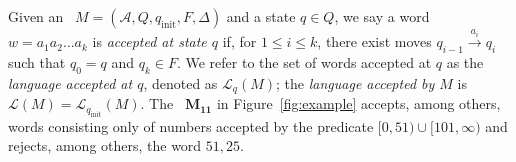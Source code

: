 Given an \SFA\ $M = (\mathcal{A}, Q, q_\text{init}, F, \Delta)$
and a state $q \in Q$, 
we say a word $w = a_1 a_2 \ldots a_k$ is \emph{accepted at state $q$}
if, for $1 \leq i \leq k$, there exist moves $q_{i-1} \xrightarrow{a_i} q_i$
such that $q_0 = q$ and $q_k \in F$.
We refer to the set of words accepted at $q$ as the
\emph{language accepted at $q$}, denoted as $\mathcal{L}_q(M)$;
the \emph{language accepted by $M$} is
$\mathcal{L}(M) = \mathcal{L}_{q_\text{init}}(M)$.
%
The \SFA\ $\mathbf{M_{11}}$ in Figure~\ref{fig:example}
accepts, among others, words consisting only of numbers accepted by the predicate $[0,51)\cup[101,\infty)$
and rejects, among others, the word  $51,25$.
